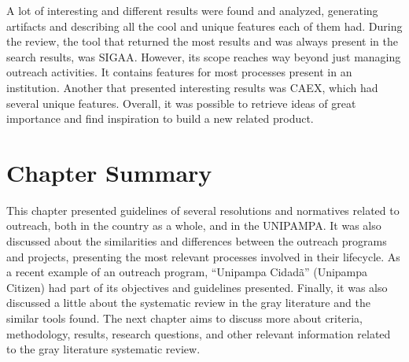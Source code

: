 A lot of interesting and different results were found and analyzed, generating artifacts and describing all the cool and unique features each of them had. During the review, the tool that returned the most results and was always present in the search results, was \ac{SIGAA}. However, its scope reaches way beyond just managing outreach activities. It contains features for most processes present in an institution. Another that presented interesting results was \ac{CAEX}, which had several unique features. Overall, it was possible to retrieve ideas of great importance and find inspiration to build a new related product.

\section{Chapter Summary}\label{sec:bac-summary}

This chapter presented guidelines of several resolutions and normatives related to outreach, both in the country as a whole, and in the \acl{UNIPAMPA}. It was also discussed about the similarities and differences between the outreach programs and projects, presenting the most relevant processes involved in their lifecycle. As a recent example of an outreach program, ``Unipampa Cidadã'' (Unipampa Citizen) had part of its objectives and guidelines presented. Finally, it was also discussed a little about the systematic review in the gray literature and the similar tools found. The next chapter aims to discuss more about criteria, methodology, results, research questions, and other relevant information related to the gray literature systematic review.